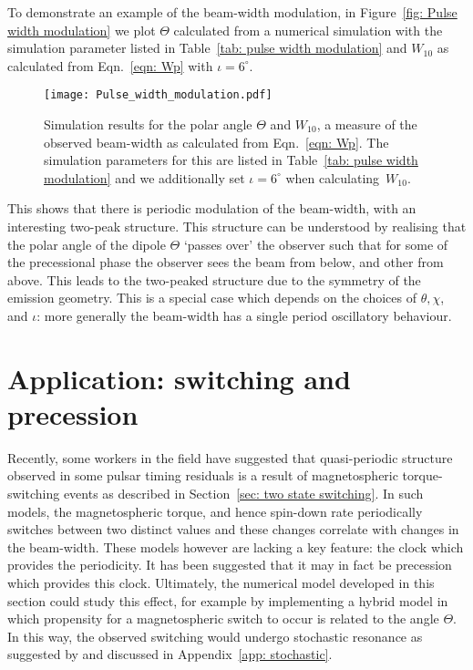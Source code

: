 \documentclass[../full_thesis/full_thesis.tex]{subfiles}
\newcommand{\thisdir}{../inertial_frame}
\begin{document}
To demonstrate an example of the beam-width modulation, in Figure~\ref{fig: Pulse width
modulation} we plot $\Theta$ calculated from a numerical simulation with the
simulation parameter listed in Table~\ref{tab: pulse width modulation} and
$W_{10}$ as calculated from Eqn.~\eqref{eqn: Wp} with $\iota=6^{\circ}$.
\begin{figure}[ht]
\centering
\texttt{[image: Pulse\_width\_modulation.pdf]}
\caption{Simulation results for the polar angle $\Theta$ and $W_{10}$, a
measure of the observed beam-width as calculated from Eqn.~\eqref{eqn: Wp}.
The simulation parameters for this are listed in Table~\ref{tab: pulse width modulation}
and we additionally set $\iota=6^{\circ}$ when calculating~$W_{10}$.}
\label{fig: Pulse width modulation}
\end{figure}
\begin{table}[htb]
\centering

\caption{Simulation parameters for the beam-width modulations plotted in
Figure~\ref{fig: Pulse width modulation}.}
\label{tab: pulse width modulation}
\end{table}

This shows that there is periodic modulation of the beam-width, with an
interesting two-peak structure. This structure can be understood by realising
that the polar angle of the dipole $\Theta$ `passes over' the observer such
that for some of the precessional phase the observer sees the beam from below,
and other from above. This leads to the two-peaked structure due to the
symmetry of the emission geometry. This is a special case which depends on
the choices of $\theta, \chi$, and $\iota$: more generally the beam-width has
a single period oscillatory behaviour.


\section{Application: switching and precession}
\label{sec: application switching and precession}

Recently, some workers in the field \citep{Lyne2010, Perera2015} have suggested
that quasi-periodic structure observed in some pulsar timing residuals is a
result of magnetospheric torque-switching events as described in
Section~\ref{sec: two state switching}. In such models, the magnetospheric
torque, and hence spin-down rate periodically switches between two distinct
values and these changes correlate with changes in the beam-width.  These
models however are lacking a key feature: the clock which provides the
periodicity. It has been suggested \citep{Jones2012} that it may in fact be
precession which provides this clock. Ultimately, the numerical model developed
in this section could study this effect, for example by implementing a hybrid
model in which propensity for a magnetospheric switch to occur is related to
the angle $\Theta$. In this way, the observed switching would undergo
stochastic resonance as suggested by \citet{Cordes2013} and discussed in
Appendix~\ref{app: stochastic}.
\end{document}
